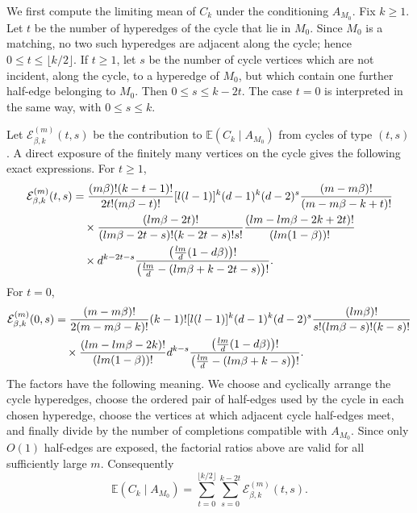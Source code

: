 \documentclass[11pt]{amsart}
\theoremstyle{plain}
\numberwithin{equation}{section}
\numberwithin{theorem}{section}
\numberwithin{figure}{section}
\begin{document}
We first compute the limiting mean of \(C_k\) under the conditioning \(A_{M_0}\).
Fix \(k\ge1\).  Let \(t\) be the number of hyperedges of the cycle that lie in
\(M_0\).  Since \(M_0\) is a matching, no two such hyperedges are adjacent along
the cycle; hence \(0\le t\le\lfloor k/2\rfloor\).  If \(t\ge1\), let \(s\) be the
number of cycle vertices which are not incident, along the cycle, to a
hyperedge of \(M_0\), but which contain one further half-edge belonging to
\(M_0\).  Then \(0\le s\le k-2t\).  The case \(t=0\) is interpreted in the same way,
with \(0\le s\le k\).

Let \(\mathcal E^{(m)}_{\beta,k}(t,s)\) be the contribution to
\(\mathbb E(C_k\mid A_{M_0})\) from cycles of type \((t,s)\).  A direct exposure of
the finitely many vertices on the cycle gives the following exact expressions.
For \(t\ge1\),
\begin{align}
\mathcal E^{(m)}_{\beta,k}(t,s)
&=\frac{(m\beta)!(k-t-1)!}{2t!(m\beta-t)!}[l(l-1)]^k(d-1)^k(d-2)^s
   \frac{(m-m\beta)!}{(m-m\beta-k+t)!} \notag\\
&\quad\times
   \frac{(lm\beta-2t)!}{(lm\beta-2t-s)!(k-2t-s)!s!}
   \frac{(lm-lm\beta-2k+2t)!}{(lm(1-\beta))!} \notag\\
&\quad\times
   d^{k-2t-s}
   \frac{\bigl(\frac{lm}{d}(1-d\beta)\bigr)!}
        {\bigl(\frac{lm}{d}-(lm\beta+k-2t-s)\bigr)!} .
\label{eq:Ebeta-k-ts}
\end{align}
For \(t=0\),
\begin{align}
\mathcal E^{(m)}_{\beta,k}(0,s)
&=\frac{(m-m\beta)!}{2(m-m\beta-k)!}(k-1)![l(l-1)]^k(d-1)^k(d-2)^s
   \frac{(lm\beta)!}{s!(lm\beta-s)!(k-s)!} \notag\\
&\quad\times
   \frac{(lm-lm\beta-2k)!}{(lm(1-\beta))!}
   d^{k-s}
   \frac{\bigl(\frac{lm}{d}(1-d\beta)\bigr)!}
        {\bigl(\frac{lm}{d}-(lm\beta+k-s)\bigr)!} .
\label{eq:Ebeta-k-0s}
\end{align}
The factors have the following meaning.  We choose and cyclically arrange the
cycle hyperedges, choose the ordered pair of half-edges used by the cycle in
each chosen hyperedge, choose the vertices at which adjacent cycle half-edges
meet, and finally divide by the number of completions compatible with
\(A_{M_0}\).  Since only \(O(1)\) half-edges are exposed, the factorial ratios above
are valid for all sufficiently large \(m\).
Consequently
\begin{equation}\label{eck}
  \mathbb E(C_k\mid A_{M_0})
  =\sum_{t=0}^{\lfloor k/2\rfloor}\sum_{s=0}^{k-2t}
     \mathcal E^{(m)}_{\beta,k}(t,s).
\end{equation}
\end{document}
